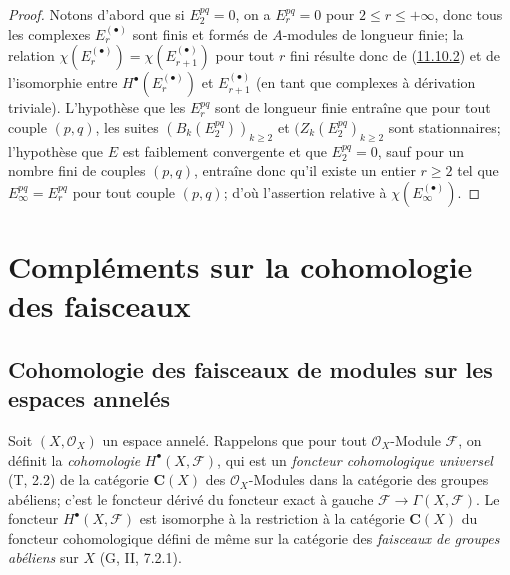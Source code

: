 \begin{proof}
Notons d'abord que si $E_2^{pq}=0$, on a $E_r^{pq}=0$ pour
$2\leq r\leq+\infty$, donc tous les complexes $E_r^{(\bullet)}$ sont finis et
formés de $A$-modules de longueur finie; la relation
$\chi(E_r^{(\bullet)})=\chi(E_{r+1}^{(\bullet)})$ pour tout $r$ fini résulte donc de
(\hyperref[0.11.10.2-fr]{11.10.2}) et de l'isomorphie entre
$H^\bullet(E_r^{(\bullet)})$ et $E_{r+1}^{(\bullet)}$ (en tant que complexes à
dérivation triviale). L'hypothèse que les $E_r^{pq}$ sont de longueur finie
entraîne que pour tout couple $(p,q)$, les suites
$(B_k(E_2^{pq}))_{k\geq2}$ et $(Z_k(E_2^{pq})_{k\geq2}$ sont stationnaires;
l'hypothèse que $E$ est faiblement convergente et que $E_2^{pq}=0$, sauf
pour un nombre fini de couples $(p,q)$, entraîne donc qu'il existe un entier
$r\geq2$ tel que $E_\infty^{pq}=E_r^{pq}$ pour tout couple $(p,q)$; d'où
l'assertion relative à $\chi(E_\infty^{(\bullet)})$.
\end{proof}

\section{Compléments sur la cohomologie des faisceaux}
\label{section:0.12-fr}

\subsection{Cohomologie des faisceaux de modules sur les espaces annelés}
\label{subsection:0.12.1-fr}

\begin{env}[12.1.1]
\label{0.12.1.1-fr}
Soit $(X,\mathcal O_X)$ un espace annelé. Rappelons que pour tout
$\mathcal O_X$-Module $\mathcal F$, on définit la \emph{cohomologie}
$H^\bullet(X,\mathcal F)$, qui est un \emph{foncteur cohomologique universel}
(T, 2.2) de la catégorie $\boldsymbol{C}(X)$ des $\mathcal O_X$-Modules dans la catégorie
des groupes abéliens; c'est le foncteur dérivé du foncteur exact à gauche
$\mathcal F\to\Gamma(X,\mathcal F)$. Le foncteur $H^\bullet(X,\mathcal F)$
est isomorphe
à la restriction à la catégorie $\boldsymbol{C}(X)$ du foncteur cohomologique défini de
même sur la catégorie des \emph{faisceaux de groupes abéliens} sur $X$
(G, II, 7.2.1).
\end{env}

